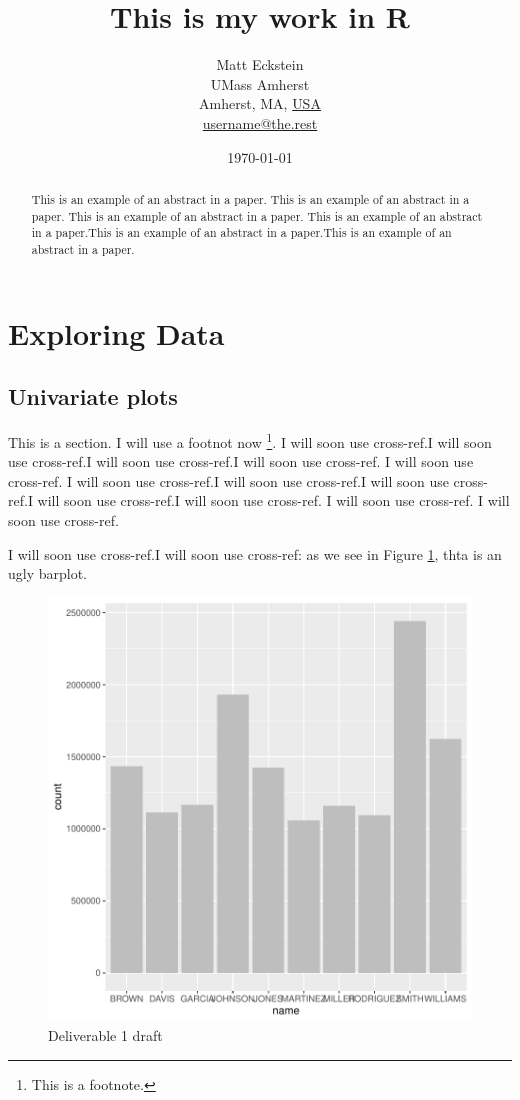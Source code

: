 \documentclass[a4paper, 12pt]{article}
\title{This is my work in R}
\author{ Matt Eckstein\\UMass Amherst\\
         Amherst, MA, \underline{USA}\\
        \url{username@the.rest}}
\date{\today}  %
\begin{document}


\maketitle 
\begin{abstract}
This is an example of an abstract in a paper. This is an example of an abstract in a paper. This is an example of an abstract in a paper. This is an example of an abstract in a paper.This is an example of an abstract in a paper.This is an example of an abstract in a paper.
\end{abstract}

\newpage

\section{Exploring Data}\label{explo-data} %

\subsection{Univariate plots}
This is a section. I will use a footnot now \footnote{This is a footnote.}. I will soon use cross-ref.I will soon use cross-ref.I will soon use cross-ref.I will soon use cross-ref. I will soon use cross-ref. I will soon use cross-ref.I will soon use cross-ref.I will soon use cross-ref.I will soon use cross-ref.I will soon use cross-ref. I will soon use cross-ref. I will soon use cross-ref.


I will soon use cross-ref.I will soon use cross-ref: as we see in Figure \ref{fig:theDeli_1}, thta is an ugly barplot.

\begin{figure}[h]
\centering
\includegraphics{draft_paper_v2-theDeli_1}
\caption{Deliverable 1 draft}  %
\label{fig:theDeli_1} %
\end{figure}
\end{document}
